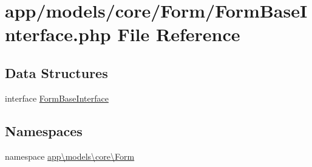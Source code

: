 \hypertarget{_form_base_interface_8php}{\section{app/models/core/\-Form/\-Form\-Base\-Interface.php File Reference}
\label{_form_base_interface_8php}
}
\subsection*{Data Structures}
\begin{DoxyCompactItemize}
\item 
interface \hyperlink{interfaceapp_1_1models_1_1core_1_1_form_1_1_form_base_interface}{Form\-Base\-Interface}
\end{DoxyCompactItemize}
\subsection*{Namespaces}
\begin{DoxyCompactItemize}
\item 
namespace \hyperlink{namespaceapp_1_1models_1_1core_1_1_form}{app\textbackslash{}models\textbackslash{}core\textbackslash{}\-Form}
\end{DoxyCompactItemize}
